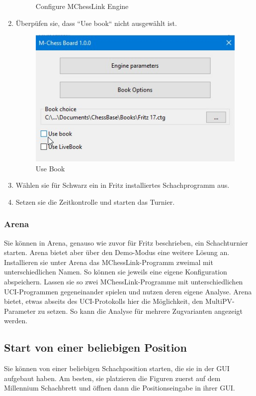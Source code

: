 \documentclass[11pt,a4paper]{article}
\begin{document}
\begin{enumerate}
\begin{figure}[H]
		\caption{Configure MChessLink Engine}
		\label{fig:FritzConfigureCertabo}
	\end{figure}
	
	\item Überpüfen sie, dass ``Use book`` nicht ausgewählt ist.
	\begin{figure}[H]
		\centering
		\includegraphics[scale=0.6]{fritz_engineusebook.jpg}
		\caption{Use Book}
		\label{fig:FritzUseBook}
	\end{figure}
	\item Wählen sie für Schwarz ein in Fritz installiertes Schachprogramm aus.
	\item Setzen sie die Zeitkontrolle und starten das Turnier.	
\end{enumerate}
\subsubsection{Arena}
Sie können in Arena, genauso wie zuvor für Fritz beschrieben, ein Schachturnier starten. Arena bietet aber über den Demo-Modus eine weitere Lösung an. Installieren sie unter Arena das MChessLink-Programm zweimal mit unterschiedlichen Namen. So können sie jeweils eine eigene Konfiguration abspeichern. Lassen sie so zwei MChessLink-Programme mit unterschiedlichen UCI-Programmen gegeneinander spielen und nutzen deren eigene Analyse. Arena bietet, etwas abseits des UCI-Protokolls hier die Möglichkeit, den MultiPV-Parameter zu setzen. So kann die Analyse für mehrere Zugvarianten angezeigt werden.

\subsection{Start von einer beliebigen Position}
Sie können von einer beliebigen Schachposition starten, die sie in der GUI aufgebaut haben. Am besten, sie platzieren die Figuren zuerst auf dem Millennium Schachbrett und öffnen dann die Positionseingabe in ihrer GUI.
\end{document}
